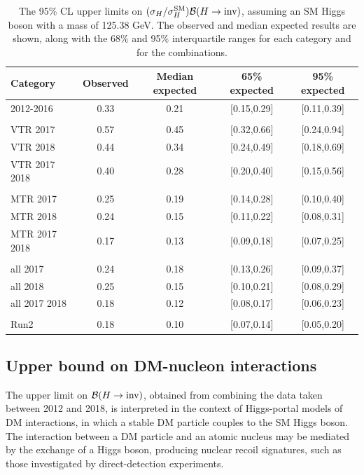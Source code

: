 \begin{table}[h!]
    \centering
    \caption{The 95\% CL upper limits on ${(\sigma_{H}/\sigma_{H}^{\mathrm{SM}}) {\mathcal{B}(H\rightarrow\text{inv})}}$, assuming an SM Higgs boson with a mass of 125.38 GeV. 
    The observed and median expected results are shown, along with the 68\% and 95\%  interquartile ranges for each 
    category and for the combinations.}
    \label{tab:limits}
    \def\arraystretch{1.05}
    \begin{tabular}{l c c c c}
       \hline
       Category & Observed & Median expected  & 65\% expected & 95\% expected \\
       \hline
          2012-2016  & 0.33  & 0.21  & [0.15,0.29]  & [0.11,0.39] \\ \\
          VTR 2017  & 0.57  & 0.45  & [0.32,0.66]  & [0.24,0.94] \\ 
          VTR 2018  & 0.44  & 0.34  & [0.24,0.49]  & [0.18,0.69] \\ 
     VTR 2017 2018  & 0.40  & 0.28  & [0.20,0.40]  & [0.15,0.56] \\ \\
          MTR 2017  & 0.25  & 0.19  & [0.14,0.28]  & [0.10,0.40] \\ 
          MTR 2018  & 0.24  & 0.15  & [0.11,0.22]  & [0.08,0.31] \\ 
     MTR 2017 2018  & 0.17  & 0.13  & [0.09,0.18]  & [0.07,0.25] \\ \\
          all 2017  & 0.24  & 0.18  & [0.13,0.26]  & [0.09,0.37] \\ 
          all 2018  & 0.25  & 0.15  & [0.10,0.21]  & [0.08,0.29] \\ 
     all 2017 2018  & 0.18  & 0.12  & [0.08,0.17]  & [0.06,0.23] \\ \\
              Run2  & 0.18  & 0.10  & [0.07,0.14]  & [0.05,0.20] \\ 
       \hline
    \end{tabular}
\end{table}

\subsection{Upper bound on DM-nucleon interactions}

The upper limit on ${\mathcal{B}(H\rightarrow\text{inv})}$, obtained from combining the data taken between 2012 and 2018,
is interpreted in the context of Higgs-portal models of DM interactions, in which a stable 
DM particle couples to the SM Higgs boson. The interaction between a DM particle and an
atomic nucleus may be mediated by the exchange of a Higgs boson,
producing nuclear recoil signatures, such as those investigated by
direct-detection experiments. 

